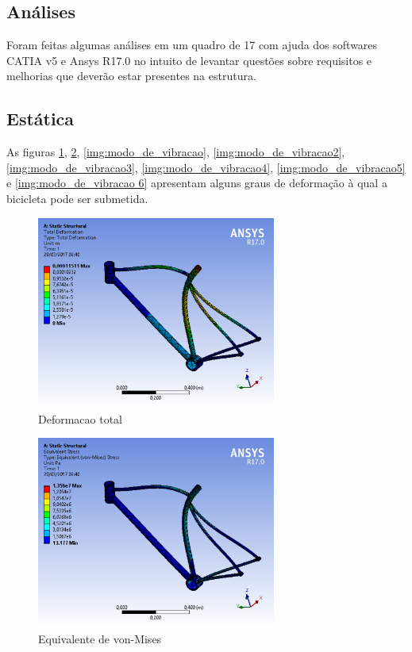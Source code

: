 \newpage

	\subsection{Análises}
	Foram feitas algumas análises em um quadro de 17 com ajuda dos softwares CATIA v5 e Ansys R17.0 no intuito de levantar questões sobre requisitos e melhorias que deverão estar presentes na estrutura.
	
	\subsection{Estática}
	As figuras \ref{img:deformacao_total}, \ref{img:equivalente_de_von_mises}, \ref{img:modo_de_vibracao}, \ref{img:modo_de_vibracao2}, \ref{img:modo_de_vibracao3}, \ref{img:modo_de_vibracao4}, \ref{img:modo_de_vibracao5} e \ref{img:modo_de_vibracao 6} apresentam alguns graus de deformação à qual a bicicleta pode ser submetida. 	
	
\graphicspath{{figuras/}}
	\begin{figure}[h!]
	\centering
	\includegraphics[width=0.7\textwidth]{deformacao_total.png}
	\caption{Deformacao total}
	\label{img:deformacao_total}
	\end{figure}	
	
\graphicspath{{figuras/}}
	\begin{figure}[h!]
	\centering
	\includegraphics[width=0.7\textwidth]{equivalente_de_von_mises.png}
	\caption{Equivalente de von-Mises}
	\label{img:equivalente_de_von_mises}
	\end{figure}	
	
